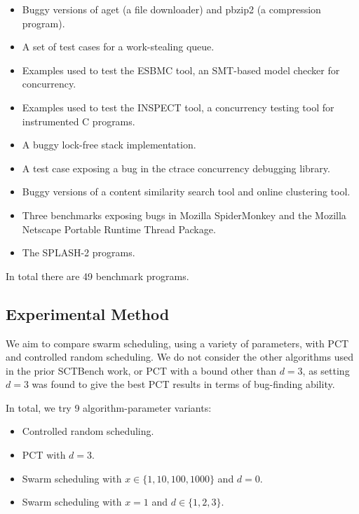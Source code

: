 \begin{itemize}
\item Buggy versions of aget (a file downloader) and pbzip2 (a compression
program).
\item A set of test cases for a work-stealing queue.
\item Examples used to test the ESBMC tool\cite{cordeiro2011}, an SMT-based
model checker for concurrency.
\item Examples used to test the INSPECT tool\cite{yang2008}, a concurrency
testing tool for instrumented C programs.
\item A buggy lock-free stack implementation.
\item A test case exposing a bug in the ctrace\cite{mcpherson2003}
  concurrency debugging library.
\item Buggy versions of a content similarity search tool and online clustering
tool.
\item Three benchmarks exposing bugs in Mozilla
  SpiderMonkey\cite{eich1996} and the Mozilla Net\-scape Portable
  Runtime Thread Package\cite{mozilla1996}.
\item The SPLASH-2 programs\cite{woo1995}.
\end{itemize}

In total there are 49 benchmark programs.

\subsection{Experimental Method}
\label{sec:algorithms-eval-method}

We aim to compare swarm scheduling, using a variety of parameters, with PCT and
controlled random scheduling.  We do not consider the other algorithms used in
the prior SCTBench work, or PCT with a bound other than $d=3$, as setting $d=3$ was
found to give the best PCT results in terms of bug-finding ability\cite{thomson2016}.

In total, we try 9 algorithm-parameter variants:

\begin{itemize}
\item Controlled random scheduling.
\item PCT with $d=3$.
\item Swarm scheduling with $x \in \{1,10,100,1000\}$ and $d=0$.
\item Swarm scheduling with $x=1$ and $d \in \{1,2,3\}$.
\end{itemize}

